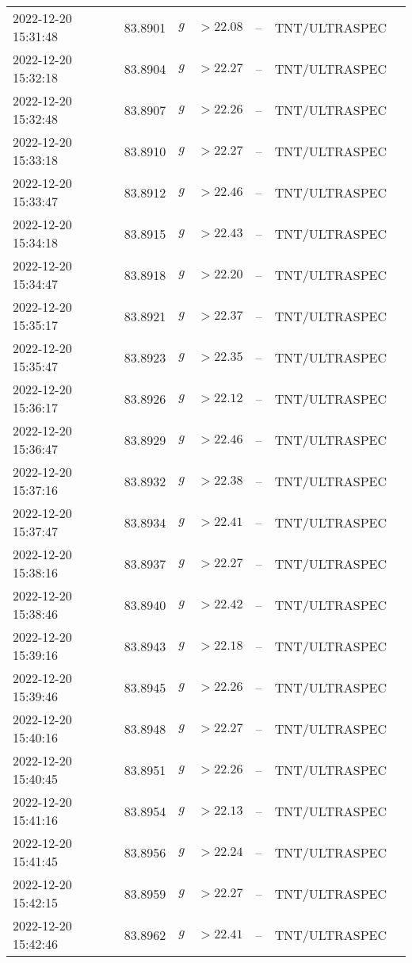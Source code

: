 \documentclass{nature_plusfigure}
\begin{document}
\begin{supplement}
\begin{center}
\begin{longtable}{lllllll}
2022-12-20 15:31:48 & 83.8901 & $g$ & $>22.08$ & -- & TNT/ULTRASPEC &  \\ 
2022-12-20 15:32:18 & 83.8904 & $g$ & $>22.27$ & -- & TNT/ULTRASPEC &  \\ 
2022-12-20 15:32:48 & 83.8907 & $g$ & $>22.26$ & -- & TNT/ULTRASPEC &  \\ 
2022-12-20 15:33:18 & 83.8910 & $g$ & $>22.27$ & -- & TNT/ULTRASPEC &  \\ 
2022-12-20 15:33:47 & 83.8912 & $g$ & $>22.46$ & -- & TNT/ULTRASPEC &  \\ 
2022-12-20 15:34:18 & 83.8915 & $g$ & $>22.43$ & -- & TNT/ULTRASPEC &  \\ 
2022-12-20 15:34:47 & 83.8918 & $g$ & $>22.20$ & -- & TNT/ULTRASPEC &  \\ 
2022-12-20 15:35:17 & 83.8921 & $g$ & $>22.37$ & -- & TNT/ULTRASPEC &  \\ 
2022-12-20 15:35:47 & 83.8923 & $g$ & $>22.35$ & -- & TNT/ULTRASPEC &  \\ 
2022-12-20 15:36:17 & 83.8926 & $g$ & $>22.12$ & -- & TNT/ULTRASPEC &  \\ 
2022-12-20 15:36:47 & 83.8929 & $g$ & $>22.46$ & -- & TNT/ULTRASPEC &  \\ 
2022-12-20 15:37:16 & 83.8932 & $g$ & $>22.38$ & -- & TNT/ULTRASPEC &  \\ 
2022-12-20 15:37:47 & 83.8934 & $g$ & $>22.41$ & -- & TNT/ULTRASPEC &  \\ 
2022-12-20 15:38:16 & 83.8937 & $g$ & $>22.27$ & -- & TNT/ULTRASPEC &  \\ 
2022-12-20 15:38:46 & 83.8940 & $g$ & $>22.42$ & -- & TNT/ULTRASPEC &  \\ 
2022-12-20 15:39:16 & 83.8943 & $g$ & $>22.18$ & -- & TNT/ULTRASPEC &  \\ 
2022-12-20 15:39:46 & 83.8945 & $g$ & $>22.26$ & -- & TNT/ULTRASPEC &  \\ 
2022-12-20 15:40:16 & 83.8948 & $g$ & $>22.27$ & -- & TNT/ULTRASPEC &  \\ 
2022-12-20 15:40:45 & 83.8951 & $g$ & $>22.26$ & -- & TNT/ULTRASPEC &  \\ 
2022-12-20 15:41:16 & 83.8954 & $g$ & $>22.13$ & -- & TNT/ULTRASPEC &  \\ 
2022-12-20 15:41:45 & 83.8956 & $g$ & $>22.24$ & -- & TNT/ULTRASPEC &  \\ 
2022-12-20 15:42:15 & 83.8959 & $g$ & $>22.27$ & -- & TNT/ULTRASPEC &  \\ 
2022-12-20 15:42:46 & 83.8962 & $g$ & $>22.41$ & -- & TNT/ULTRASPEC &  \\ 

\end{longtable}
\end{center}
\end{supplement}
\end{document}
